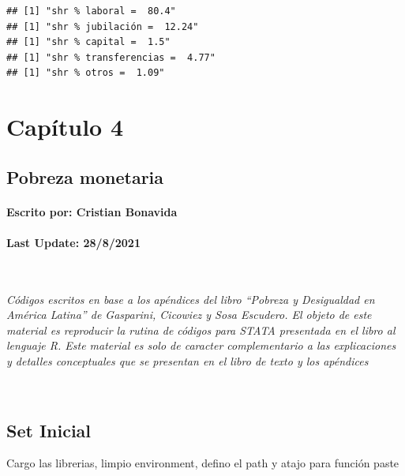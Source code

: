 \documentclass[
]{book}
\begin{document}
\begin{verbatim}
## [1] "shr % laboral =  80.4"
## [1] "shr % jubilación =  12.24"
## [1] "shr % capital =  1.5"
## [1] "shr % transferencias =  4.77"
## [1] "shr % otros =  1.09"
\end{verbatim}

\hypertarget{capuxedtulo-4}{%
\chapter{Capítulo 4}\label{capuxedtulo-4}}

\hypertarget{pobreza-monetaria}{%
\section*{Pobreza monetaria}\label{pobreza-monetaria}}

\hypertarget{escrito-por-cristian-bonavida-2}{%
\subsubsection*{Escrito por: Cristian Bonavida}\label{escrito-por-cristian-bonavida-2}}

\hypertarget{last-update-2882021}{%
\subsubsection*{Last Update: 28/8/2021}\label{last-update-2882021}}

~

\emph{Códigos escritos en base a los apéndices del libro ``Pobreza y Desigualdad en América Latina'' de Gasparini, Cicowiez y Sosa Escudero. El objeto de este material es reproducir la rutina de códigos para STATA presentada en el libro al lenguaje R. Este material es solo de caracter complementario a las explicaciones y detalles conceptuales que se presentan en el libro de texto y los apéndices}

~

\hypertarget{set-inicial-2}{%
\section*{Set Inicial}\label{set-inicial-2}}

Cargo las librerias, limpio environment, defino el path y atajo para función paste
\end{document}
